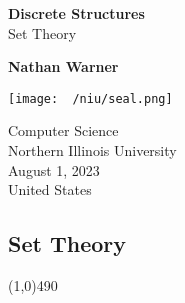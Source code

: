 \documentclass{report}
\title{\Huge{}}
\author{\huge{Nathan Warner}}
\date{\huge{}}
\begin{document}
        \begin{titlepage}
       \begin{center}
           \vspace*{1cm}
    
           \textbf{Discrete Structures}\\
           Set Theory
    
           \vspace{0.5cm}
            
                
           \vspace{1.5cm}
           \textbf{Nathan Warner}
    
           \vfill
                
                
           \vspace{0.8cm}
         
           \texttt{[image: ~/niu/seal.png]}
                
           Computer Science \\
           Northern Illinois University\\
           August 1, 2023 \\
           United States\\
           
                
       \end{center}
    \end{titlepage}
    \tableofcontents
    \pagebreak 
    \begin{center}
        \section{Set Theory}
    \end{center}
    \line(1,0){490}
    \bigbreak \noindent 
\end{document}
